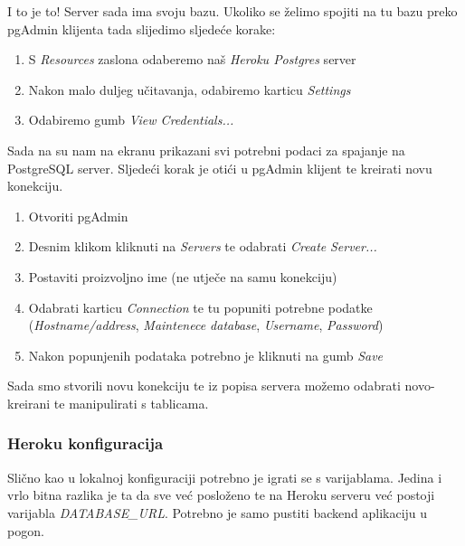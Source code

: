 								I to je to! Server sada ima svoju bazu. Ukoliko se želimo spojiti na tu bazu preko pgAdmin klijenta tada slijedimo sljedeće korake:
								
								\begin{enumerate}
										\item S \textit{Resources} zaslona odaberemo naš \textit{Heroku Postgres} server
										\item Nakon malo duljeg učitavanja, odabiremo karticu \textit{Settings}
										\item Odabiremo gumb \textit{View Credentials...}
								\end{enumerate}
								
								Sada na su nam na ekranu prikazani svi potrebni podaci za spajanje na PostgreSQL server. Sljedeći korak je otići u pgAdmin klijent te kreirati novu konekciju.
								
								\begin{enumerate}
										\item Otvoriti pgAdmin
										\item Desnim klikom kliknuti na \textit{Servers} te odabrati \textit{Create} \textit{Server...}
										\item Postaviti proizvoljno ime (ne utječe na samu konekciju)
										\item Odabrati karticu \textit{Connection} te tu popuniti potrebne podatke (\textit{Hostname/address}, \textit{Maintenece database}, \textit{Username}, \textit{Password})
										\item Nakon popunjenih podataka potrebno je kliknuti na gumb \textit{Save}
								\end{enumerate}
								
								Sada smo stvorili novu konekciju te iz popisa servera možemo odabrati novo-kreirani te manipulirati s tablicama.
								
				
						\subsubsection*{Heroku konfiguracija}
							
							Slično kao u lokalnoj konfiguraciji potrebno je igrati se s varijablama. Jedina i vrlo bitna razlika je ta da sve već posloženo te na Heroku serveru već postoji varijabla \textit{DATABASE\_URL}. Potrebno je samo pustiti backend aplikaciju u pogon.
					
			\eject